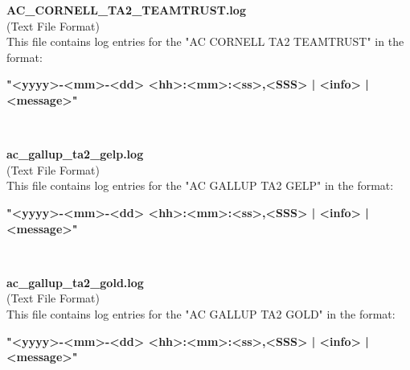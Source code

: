 \begin{description}
\begin{addmargin}[0em]{0em}
    \label{AC_CORNELL_TA2_TEAMTRUST.log}
    \begin{addmargin}[1em]{0em} %
        \textbf{AC\_CORNELL\_TA2\_TEAMTRUST.log}\\
        (Text File Format)\\
        This file contains log entries for the "AC CORNELL TA2 TEAMTRUST" in the format:
        \begin{addmargin}[1em]{0em}
            \textbf{"<yyyy>-<mm>-<dd> <hh>:<mm>:<ss>,<SSS> | <info> | <message>"}
        \end{addmargin}
    \end{addmargin} %
    \textbf{\\}

    \label{ac_gallup_ta2_gelp.log}
    \begin{addmargin}[1em]{0em} %
        \textbf{ac\_gallup\_ta2\_gelp.log}\\
        (Text File Format)\\
        This file contains log entries for the "AC GALLUP TA2 GELP" in the format:
        \begin{addmargin}[1em]{0em}
            \textbf{"<yyyy>-<mm>-<dd> <hh>:<mm>:<ss>,<SSS> | <info> | <message>"}
        \end{addmargin}
    \end{addmargin} %
    \textbf{\\}

    \label{ac_gallup_ta2_gold.log}
    \begin{addmargin}[1em]{0em} %
        \textbf{ac\_gallup\_ta2\_gold.log}\\
        (Text File Format)\\
        This file contains log entries for the "AC GALLUP TA2 GOLD" in the format:
        \begin{addmargin}[1em]{0em}
            \textbf{"<yyyy>-<mm>-<dd> <hh>:<mm>:<ss>,<SSS> | <info> | <message>"}
        \end{addmargin}
    \end{addmargin} %
    \textbf{\\}


\end{addmargin}
\end{description}
